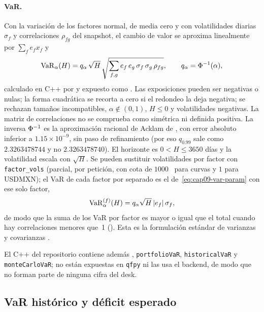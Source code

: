 \paragraph{VaR.} Con la variación de los factores normal, de media cero y con volatilidades diarias $\sigma_f$ y correlaciones $\rho_{fg}$ del snapshot, el cambio de valor se aproxima linealmente por $\sum_f e_f x_f$ y
\begin{equation}\label{eq:cap09-var-param}
  \mathrm{VaR}_{\alpha}(H)=q_\alpha\,\sqrt{H}\,\sqrt{\sum_{f,g}e_f\,e_g\,\sigma_f\,\sigma_g\,\rho_{fg}},\qquad q_\alpha=\Phi^{-1}(\alpha),
\end{equation}
calculado en C++ por  y expuesto como . Las exposiciones pueden ser negativas o nulas; la forma cuadrática se recorta a cero si el redondeo la deja negativa; se rechazan tamaños incompatibles, $\alpha\notin(0,1)$, $H\le0$ y volatilidades negativas. La matriz de correlaciones no se comprueba como simétrica ni definida positiva. La inversa $\Phi^{-1}$ es la aproximación racional de Acklam de , con error absoluto inferior a $1.15\times10^{-9}$, sin paso de refinamiento (por eso $q_{0.99}$ sale como $2.3263478744$ y no $2.3263478740$). El horizonte es $0<H\le3650$ días y la volatilidad escala con $\sqrt H$. Se pueden sustituir volatilidades por factor con \texttt{factor\_vols} (parcial, por petición, con cota de $1000$~\pb{} para curvas y $1$ para USDMXN); el VaR de cada factor por separado es el de~\eqref{eq:cap09-var-param} con ese solo factor,
\begin{equation}\label{eq:cap09-var-factor}
  \mathrm{VaR}_{\alpha}^{(f)}(H)=q_\alpha\sqrt{H}\,|e_f|\,\sigma_f ,
\end{equation}
de modo que la suma de los VaR por factor es mayor o igual que el total cuando hay correlaciones menores que~1 (). Esta es la formulación estándar de varianzas y covarianzas \citep{jorion2007,mcneil2015}.

El C++ del repositorio contiene además , \texttt{portfolioVaR}, \texttt{historicalVaR} y \texttt{monteCarloVaR}; no están expuestas en \texttt{qfpy} ni las usa el backend, de modo que no forman parte de ninguna cifra del desk.

\subsection{VaR histórico y déficit esperado}\label{sec:cap09-hist}

